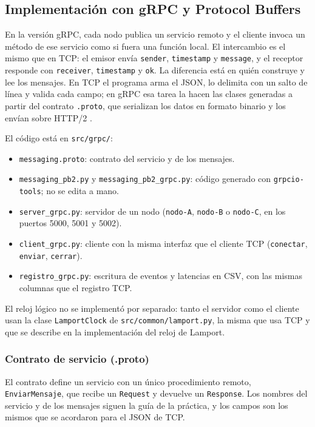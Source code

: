 \subsection{Implementación con gRPC y Protocol Buffers}

En la versión gRPC, cada nodo publica un servicio remoto y el cliente invoca un método de ese servicio como si fuera una función local. El intercambio es el mismo que en TCP: el emisor envía \texttt{sender}, \texttt{timestamp} y \texttt{message}, y el receptor responde con \texttt{receiver}, \texttt{timestamp} y \texttt{ok}. La diferencia está en quién construye y lee los mensajes. En TCP el programa arma el JSON, lo delimita con un salto de línea y valida cada campo; en gRPC esa tarea la hacen las clases generadas a partir del contrato \texttt{.proto}, que serializan los datos en formato binario y los envían sobre HTTP/2 \cite{niswar2024grpc,sliwa2021grpc}.

El código está en \texttt{src/grpc/}:
\begin{itemize}
	\item \texttt{messaging.proto}: contrato del servicio y de los mensajes.
	\item \texttt{messaging\_pb2.py} y \texttt{messaging\_pb2\_grpc.py}: código generado con \texttt{grpcio-tools}; no se edita a mano.
	\item \texttt{server\_grpc.py}: servidor de un nodo (\texttt{nodo-A}, \texttt{nodo-B} o \texttt{nodo-C}, en los puertos 5000, 5001 y 5002).
	\item \texttt{client\_grpc.py}: cliente con la misma interfaz que el cliente TCP (\texttt{conectar}, \texttt{enviar}, \texttt{cerrar}).
	\item \texttt{registro\_grpc.py}: escritura de eventos y latencias en CSV, con las mismas columnas que el registro TCP.
\end{itemize}
El reloj lógico no se implementó por separado: tanto el servidor como el cliente usan la clase \texttt{LamportClock} de \texttt{src/common/lamport.py}, la misma que usa TCP y que se describe en la implementación del reloj de Lamport.

\subsubsection{Contrato de servicio (.proto)}

El contrato define un servicio con un único procedimiento remoto, \texttt{EnviarMensaje}, que recibe un \texttt{Request} y devuelve un \texttt{Response}. Los nombres del servicio y de los mensajes siguen la guía de la práctica, y los campos son los mismos que se acordaron para el JSON de TCP.


